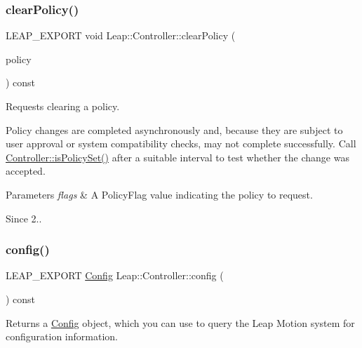 \subsubsection{\texorpdfstring{clear\+Policy()}{clearPolicy()}}
{\footnotesize\ttfamily L\+E\+A\+P\+\_\+\+E\+X\+P\+O\+RT void Leap\+::\+Controller\+::clear\+Policy (\begin{DoxyParamCaption}\item[{\hyperlink{class_leap_1_1_controller_a0bdb49fa94aa2da8b098c1ac296528d6}{Policy\+Flag}}]{policy }\end{DoxyParamCaption}) const}

Requests clearing a policy.

Policy changes are completed asynchronously and, because they are subject to user approval or system compatibility checks, may not complete successfully. Call \hyperlink{class_leap_1_1_controller_a75bfba23a30619a3514fa1d654b4df29}{Controller\+::is\+Policy\+Set()} after a suitable interval to test whether the change was accepted.


\begin{DoxyCodeInclude}
\end{DoxyCodeInclude}



\begin{DoxyParams}{Parameters}
{\em flags} & A Policy\+Flag value indicating the policy to request. \\
\hline
\end{DoxyParams}
\begin{DoxySince}{Since}
2.. 
\end{DoxySince}
\mbox{\label{class_leap_1_1_controller_ac042539e24f69b873662aa4e4d8ebcfe}} 
\subsubsection{\texorpdfstring{config()}{config()}}
{\footnotesize\ttfamily L\+E\+A\+P\+\_\+\+E\+X\+P\+O\+RT \hyperlink{class_leap_1_1_config}{Config} Leap\+::\+Controller\+::config (\begin{DoxyParamCaption}{ }\end{DoxyParamCaption}) const}

Returns a \hyperlink{class_leap_1_1_config}{Config} object, which you can use to query the Leap Motion system for configuration information.


